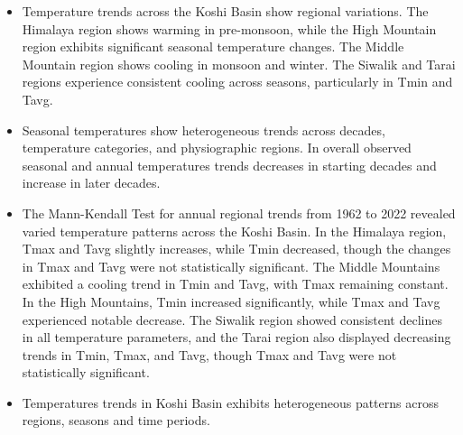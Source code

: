 

\begin{itemize}
  \item	Temperature trends across the Koshi Basin show regional variations. The Himalaya region shows warming in pre-monsoon, while the High Mountain region exhibits significant seasonal temperature changes. The Middle Mountain region shows cooling in monsoon and winter. The Siwalik and Tarai regions experience consistent cooling across seasons, particularly in Tmin and Tavg.
  \item	Seasonal temperatures show heterogeneous trends across decades, temperature categories, and physiographic regions. In overall observed seasonal and annual temperatures trends decreases in starting decades and increase in later decades.
  \item	The Mann-Kendall Test for annual regional trends from 1962 to 2022 revealed varied temperature patterns across the Koshi Basin. In the Himalaya region, Tmax and Tavg slightly increases, while Tmin decreased, though the changes in Tmax and Tavg were not statistically significant. The Middle Mountains exhibited a cooling trend in Tmin and Tavg, with Tmax remaining constant. In the High Mountains, Tmin increased significantly, while Tmax and Tavg experienced notable decrease. The Siwalik region showed consistent declines in all temperature parameters, and the Tarai region also displayed decreasing trends in Tmin, Tmax, and Tavg, though Tmax and Tavg were not statistically significant.
  \item	Temperatures trends in Koshi Basin exhibits heterogeneous patterns across regions, seasons and time periods.

\end{itemize}
